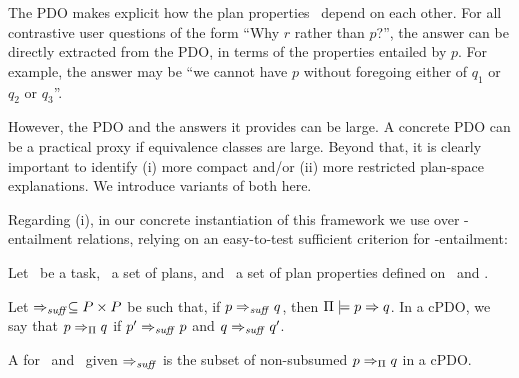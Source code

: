 The PDO makes explicit how the plan properties \props\ depend on each
other. For all contrastive user questions of the form ``Why $r$ rather
than $p$?'', the answer can be directly extracted from the PDO, in
terms of the properties entailed by $p$. For example, the answer may
be ``we cannot have $p$ without foregoing either of $q_1$ or $q_2$ or
$q_3$''.

However, the PDO and the answers it provides can be large. A concrete
PDO can be a practical proxy if equivalence classes are large. Beyond
that, it is clearly important to identify (i) more compact and/or (ii)
more restricted plan-space explanations. We introduce variants of both
here.

Regarding (i), in our concrete instantiation of this framework we use
 over \plans-entailment relations, relying on an
easy-to-test sufficient criterion for \plans-entailment:
%
%
%

\begin{definition}\label{def:dcpdo}
Let \task\ be a task, \plans\ a set of plans, and \props\ a set of
plan properties defined on \task\ and \plans.

Let $\Rightarrow_{\mathit{suff}} \subseteq P \times P$ be such that, if $p
\Rightarrow_{\mathit{suff}} q$, then $\Pi \models p \Rightarrow q$.
%
In a cPDO, we say that $p \Rightarrow_{\Pi} q$  if $p'
\Rightarrow_{\mathit{suff}} p$ and $q \Rightarrow_{\mathit{suff}} q'$.

A  for \plans\ and \props\ given
$\Rightarrow_{\mathit{suff}}$ is the subset of non-subsumed $p \Rightarrow_{\Pi} q$
in a cPDO.
%
\end{definition}

